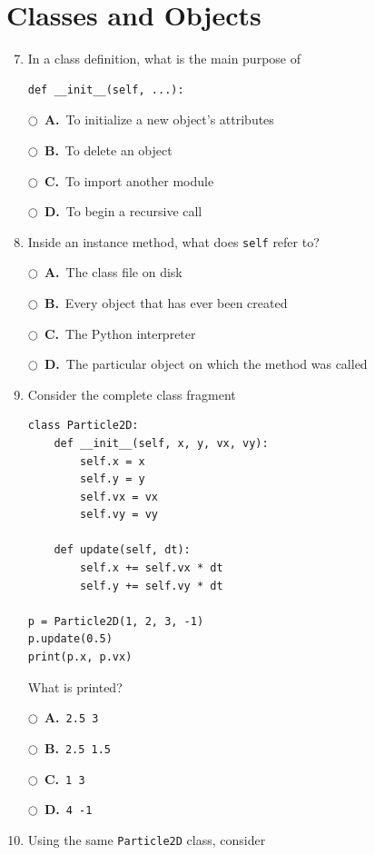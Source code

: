 \documentclass[11pt]{article}
\newcommand{\choice}[2]{%
    \par\noindent
    \(\bigcirc\)\ \textbf{#1.}\ #2
}
\begin{document}
\section*{Classes and Objects}

\begin{enumerate}
\setcounter{enumi}{6}

\item In a class definition, what is the main purpose of

\begin{verbatim}
def __init__(self, ...):
\end{verbatim}

\choice{A}{To initialize a new object's attributes}
\choice{B}{To delete an object}
\choice{C}{To import another module}
\choice{D}{To begin a recursive call}

\item Inside an instance method, what does \texttt{self} refer to?

\choice{A}{The class file on disk}
\choice{B}{Every object that has ever been created}
\choice{C}{The Python interpreter}
\choice{D}{The particular object on which the method was called}

\item Consider the complete class fragment

\begin{verbatim}
class Particle2D:
    def __init__(self, x, y, vx, vy):
        self.x = x
        self.y = y
        self.vx = vx
        self.vy = vy

    def update(self, dt):
        self.x += self.vx * dt
        self.y += self.vy * dt

p = Particle2D(1, 2, 3, -1)
p.update(0.5)
print(p.x, p.vx)
\end{verbatim}

What is printed?

\choice{A}{\texttt{2.5 3}}
\choice{B}{\texttt{2.5 1.5}}
\choice{C}{\texttt{1 3}}
\choice{D}{\texttt{4 -1}}

\item Using the same \texttt{Particle2D} class, consider


\end{enumerate}
\end{document}

